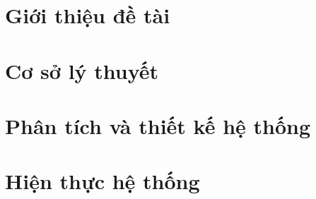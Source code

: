 \documentclass[a4paper]{article}
\begin{document}
\pagebreak
\tableofcontents
\pagebreak
{}
\pagebreak
\makeatletter
\makeatother
\listoffigures
\pagebreak


\section{Giới thiệu đề tài}

\newpage
\section{Cơ sở lý thuyết}

\newpage
\section{Phân tích và thiết kế hệ thống}

\newpage
\section{Hiện thực hệ thống}

\newpage
% 

\newpage

\end{document}
